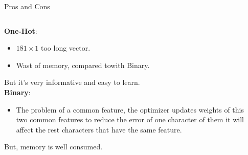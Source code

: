 \documentclass[10pt]{beamer}
\begin{document}
\begin{frame}[fragile]{Pros and Cons}


\begin{columns}
\begin{column}{0.7\textwidth}
\textbf{One-Hot}:
\begin{itemize}
    \item $181 \times 1$ too long vector.
    \item Wast of memory, compared towith Binary.
\end{itemize}
But it's very informative and easy to learn.\\[0.7cm]

\textbf{Binary}:
\begin{itemize}
    \item The problem of a common feature, the optimizer updates weights of this two common features to reduce the error of one character of them it will affect the rest characters that have the same feature.
\end{itemize}
But, memory is well consumed.
\end{column}
\begin{column}{0.35\textwidth}
\begin{center}

\end{center}
\end{column}
\end{columns}

\end{frame}
\end{document}
